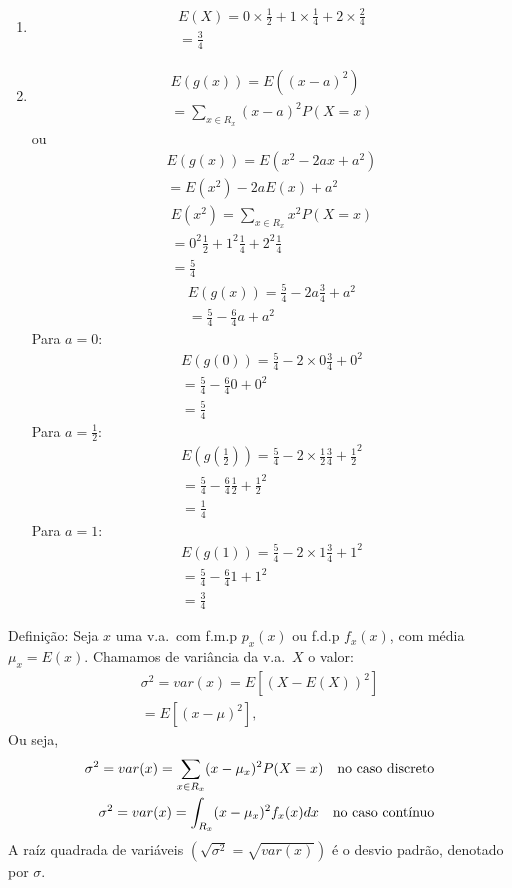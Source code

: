 \documentclass[11pt,a4paper]{article}
\begin{document}
\begin{enumerate}[label=(\alph*)]
  \item 
    \begin{align}
      E(X)=0 \times \frac{1}{2}+ 1 \times \frac{1}{4}+ 2 \times \frac{2}{4}\\
      =\frac{3}{4}
    \end{align}
  \item 
    \begin{align}
      E(g(x))=E({(x-a)}^2)\\
      =\sum_{x \in R_{x}}(x-a)^2P(X=x)
    \end{align}
    ou
    \begin{align}
      E(g(x))=E(x^2-2ax+a^2)\\
      =E(x^2)-2aE(x)+a^2
    \end{align}
    \begin{align}
      E(x^2)=\sum_{x \in R_{x}} x^2 P(X=x)\\
      =0^2 \frac{1}{2}+1^2 \frac{1}{4}+ 2^2 \frac{1}{4}\\
      =\frac{5}{4}
    \end{align}
    \begin{align}
      E(g(x))=\frac{5}{4}-2a \frac{3}{4}+a^2\\
      =\frac{5}{4}-\frac{6}{4}a+a^{2}
    \end{align}
    Para $a=0$:
    \begin{align}
      E(g(0))=\frac{5}{4}-2\times 0 \frac{3}{4}+0^2\\
      =\frac{5}{4}-\frac{6}{4}0+0^{2}\\
      =\frac{5}{4}
    \end{align}
    Para $a=\frac{1}{2}$:
    \begin{align}
      E(g(\frac{1}{2}))=\frac{5}{4}-2\times \frac{1}{2} \frac{3}{4}+\frac{1}{2}^2\\
      =\frac{5}{4}-\frac{6}{4}\frac{1}{2}+\frac{1}{2}^{2}\\
      =\frac{1}{4}
    \end{align}
    Para $a=1$:
    \begin{align}
      E(g(1))=\frac{5}{4}-2\times 1 \frac{3}{4}+1^2\\
      =\frac{5}{4}-\frac{6}{4}1+1^{2}\\
      =\frac{3}{4}
    \end{align}
\end{enumerate}
Definição: Seja $x$ uma v.a.\ com f.m.p $p_{x}(x)$ ou f.d.p $f_{x}(x)$, com 
média $\mu_{x}=E(x)$. Chamamos de variância da v.a.\ $X$ o valor: 
\begin{align}
  \sigma^2=var(x)=E[(X-E(X))^2]\\
  =E[(x-\mu)^2],
\end{align}
Ou seja,
\begin{align}
  \sigma^2 =var(x)=\sum_{x \in R_{x}} (x-\mu_{x})^2 P(X=x) \text{\quad no caso discreto}\\
  \sigma^2 =var(x)=\int_{R_{x}} (x-\mu_{x})^2 f_{x}(x)dx \text{\quad no caso contínuo}
\end{align}
A raíz quadrada de variáveis $(\sqrt{\sigma^2}=\sqrt{var(x)})$ é o desvio padrão, 
denotado por $\sigma$.
\end{document}
